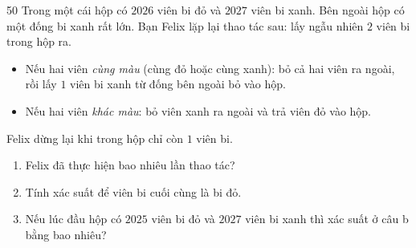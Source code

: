\begin{probbox}{50}{}
Trong một cái hộp có $2026$ viên bi đỏ và $2027$ viên bi xanh. Bên ngoài hộp có một đống bi xanh rất lớn. Bạn Felix lặp lại thao tác
sau: lấy ngẫu nhiên $2$ viên bi trong hộp ra.
\begin{itemize}[leftmargin=1.2em,itemsep=1pt,topsep=2pt]
\item Nếu hai viên \emph{cùng màu} (cùng đỏ hoặc cùng xanh): bỏ cả hai viên ra ngoài, rồi lấy $1$ viên bi xanh từ đống bên ngoài bỏ vào hộp.
\item Nếu hai viên \emph{khác màu}: bỏ viên xanh ra ngoài và trả viên đỏ vào hộp.
\end{itemize}
Felix dừng lại khi trong hộp chỉ còn $1$ viên bi.
\begin{enumerate}[label=\alph*),leftmargin=1.6em,itemsep=1pt,topsep=2pt]
\item Felix đã thực hiện bao nhiêu lần thao tác?
\item Tính xác suất để viên bi cuối cùng là bi đỏ.
\item Nếu lúc đầu hộp có $2025$ viên bi đỏ và $2027$ viên bi xanh thì xác suất ở câu b bằng bao nhiêu?
\end{enumerate}
\end{probbox}
